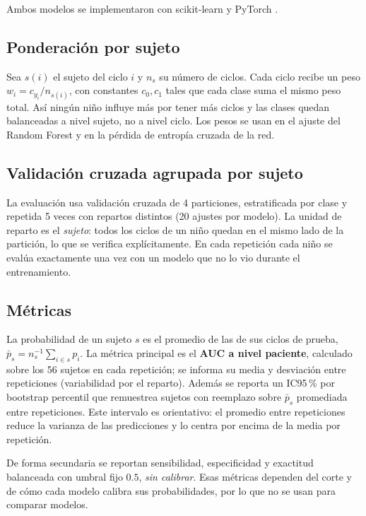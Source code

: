 \documentclass[10pt,twocolumn,a4paper]{article}
\begin{document}
Ambos modelos se implementaron con scikit-learn \cite{pedregosa2011} y PyTorch \cite{paszke2019}.

\subsection{Ponderación por sujeto}
\label{sec:pesos}

Sea $s(i)$ el sujeto del ciclo $i$ y $n_s$ su número de ciclos. Cada ciclo recibe un peso $w_i = c_{y_i}/n_{s(i)}$, con constantes $c_0, c_1$ tales que cada clase suma el mismo peso total. Así ningún niño influye más por tener más ciclos y las clases quedan balanceadas a nivel sujeto, no a nivel ciclo. Los pesos se usan en el ajuste del Random Forest y en la pérdida de entropía cruzada de la red.

\subsection{Validación cruzada agrupada por sujeto}

La evaluación usa validación cruzada de 4 particiones, estratificada por clase y repetida 5 veces con repartos distintos (20 ajustes por modelo). La unidad de reparto es el \emph{sujeto}: todos los ciclos de un niño quedan en el mismo lado de la partición, lo que se verifica explícitamente. En cada repetición cada niño se evalúa exactamente una vez con un modelo que no lo vio durante el entrenamiento.

\subsection{Métricas}

La probabilidad de un sujeto $s$ es el promedio de las de sus ciclos de prueba, $\bar p_s = n_s^{-1}\sum_{i\in s} p_i$. La métrica principal es el \textbf{AUC a nivel paciente}, calculado sobre los 56 sujetos en cada repetición; se informa su media y desviación entre repeticiones (variabilidad por el reparto). Además se reporta un IC95\,\% por bootstrap percentil que remuestrea sujetos con reemplazo \cite{efron1993} sobre $\bar p_s$ promediada entre repeticiones. Este intervalo es orientativo: el promedio entre repeticiones reduce la varianza de las predicciones y lo centra por encima de la media por repetición.

De forma secundaria se reportan sensibilidad, especificidad y exactitud balanceada con umbral fijo $0.5$, \emph{sin calibrar}. Esas métricas dependen del corte y de cómo cada modelo calibra sus probabilidades, por lo que no se usan para comparar modelos.
\end{document}
